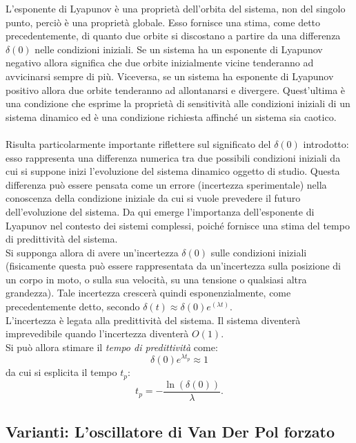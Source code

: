 \documentclass[12pt]{article}
\begin{document}
L'esponente di Lyapunov è una proprietà dell'orbita del sistema, non del singolo punto, perciò è una proprietà globale. Esso fornisce una stima, come detto precedentemente, di quanto due orbite si discostano a partire da una differenza $\delta(0)$ nelle condizioni iniziali.
Se un sistema ha un esponente di Lyapunov negativo allora significa che due orbite inizialmente  vicine tenderanno ad avvicinarsi sempre di più.
Viceversa, se un sistema ha esponente di Lyapunov positivo allora due orbite tenderanno ad allontanarsi e divergere. Quest'ultima è una condizione che esprime la proprietà di sensitività alle condizioni iniziali di un sistema dinamico ed è una condizione richiesta affinché un sistema sia caotico. \\ \\
Risulta particolarmente importante riflettere sul significato del $\delta(0)$ introdotto: esso rappresenta una differenza numerica tra due possibili condizioni iniziali da cui si suppone inizi l'evoluzione del sistema dinamico oggetto di studio.
Questa differenza può essere pensata come un errore (incertezza sperimentale) nella conoscenza della condizione iniziale da cui si vuole prevedere il futuro dell'evoluzione del sistema.
Da qui emerge l'importanza dell'esponente di Lyapunov nel contesto dei sistemi complessi, poiché fornisce una stima del tempo di predittività del sistema. \\
Si supponga allora di avere un'incertezza $\delta(0)$ sulle condizioni iniziali (fisicamente questa può essere rappresentata da un'incertezza sulla posizione di un corpo in moto, o sulla sua velocità, su una tensione o qualsiasi altra grandezza).
Tale incertezza crescerà quindi esponenzialmente, come precedentemente detto, secondo $\delta(t) \approx \delta(0)e^{(\lambda t)}$. \\
L'incertezza è legata alla predittività del sistema. Il sistema diventerà imprevedibile quando l'incertezza diventerà $O(1)$. \\
Si può allora stimare il \textit{tempo di predittività} come:
$$
\delta(0)e^{\lambda t_p} \approx 1
$$
da cui si esplicita il tempo $t_p$:
\begin{equation}
	t_p = -\frac{\ln(\delta(0))}{\lambda}.
\end{equation}

\subsection{Varianti: L'oscillatore di Van Der Pol forzato}
\end{document}
